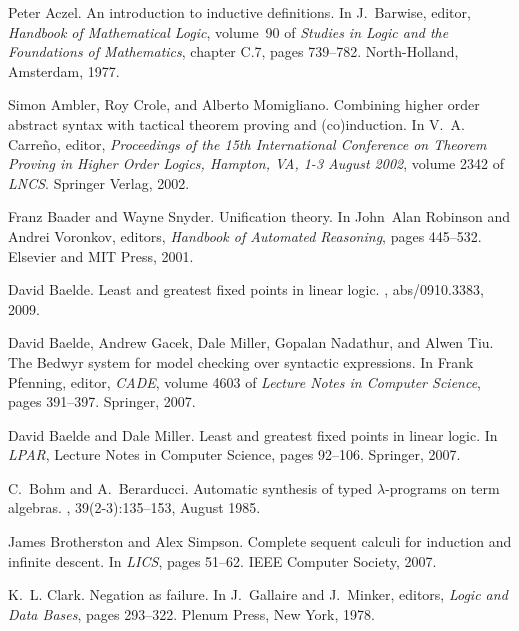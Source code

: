 \documentclass[preprint]{elsarticle}
\begin{document}
\begin{thebibliography}{10}

Peter Aczel.
\newblock An introduction to inductive definitions.
\newblock In J.~Barwise, editor, {\em Handbook of Mathematical Logic},
  volume~90 of {\em Studies in Logic and the Foundations of Mathematics},
  chapter C.7, pages 739--782. North-Holland, Amsterdam, 1977.

Simon Ambler, Roy Crole, and Alberto Momigliano.
\newblock Combining higher order abstract syntax with tactical theorem proving
  and (co)induction.
\newblock In V.~A. Carre{\~n}o, editor, {\em Proceedings of the 15th
  International Conference on Theorem Proving in Higher Order Logics, Hampton,
  VA, 1-3 August 2002}, volume 2342 of {\em LNCS}. Springer Verlag, 2002.

Franz Baader and Wayne Snyder.
\newblock Unification theory.
\newblock In John~Alan Robinson and Andrei Voronkov, editors, {\em Handbook of
  Automated Reasoning}, pages 445--532. Elsevier and MIT Press, 2001.

David Baelde.
\newblock Least and greatest fixed points in linear logic.
, abs/0910.3383, 2009.

David Baelde, Andrew Gacek, Dale Miller, Gopalan Nadathur, and Alwen Tiu.
\newblock The {B}edwyr system for model checking over syntactic expressions.
\newblock In Frank Pfenning, editor, {\em CADE}, volume 4603 of {\em Lecture
  Notes in Computer Science}, pages 391--397. Springer, 2007.

David Baelde and Dale Miller.
\newblock Least and greatest fixed points in linear logic.
\newblock In {\em LPAR}, Lecture Notes in Computer Science, pages 92--106.
  Springer, 2007.

C.~Bohm and A.~Berarducci.
\newblock Automatic synthesis of typed $\lambda$-programs on term algebras.
, 39(2-3):135--153, August 1985.

James Brotherston and Alex Simpson.
\newblock Complete sequent calculi for induction and infinite descent.
\newblock In {\em LICS}, pages 51--62. IEEE Computer Society, 2007.

K.~L. Clark.
\newblock Negation as failure.
\newblock In J.~Gallaire and J.~Minker, editors, {\em Logic and Data Bases},
  pages 293--322. Plenum Press, New York, 1978.


\end{thebibliography}
\end{document}
